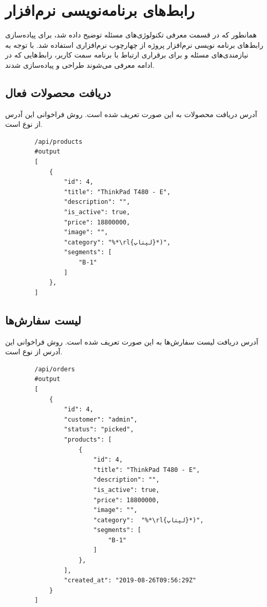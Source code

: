 \section{رابط‌های برنامه‌نویسی نرم‌افزار}
همانطور که در قسمت معرفی تکنولوژی‌های مسئله توضیح داده شد، برای پیاده‌سازی رابط‌های برنامه نویسی نرم‌افزار پروژه از چهارچوب نرم‌افزاری 
استفاده شد. با توجه به نیازمندی‌های مسئله و برای برقراری ارتباط با برنامه سمت کاربر، رابط‌هایی که در ادامه معرفی می‌شوند طراحی و پیاده‌سازی شدند.

\subsection{دریافت محصولات فعال}
آدرس دریافت محصولات به این صورت تعریف شده است. روش فراخوانی این آدرس از نوع  است.
\begin{latin}
    \begin{lstlisting}
        /api/products
        #output
        [
            {
                "id": 4,
                "title": "ThinkPad T480 - E",
                "description": "",
                "is_active": true,
                "price": 18800000,
                "image": "",
                "category": "%*\rl{لپتاپ}*)",
                "segments": [
                    "B-1"
                ]
            },
        ]

    \end{lstlisting}
\end{latin}

\subsection{لیست سفارش‌ها}
آدرس دریافت لیست سفارش‌ها به این صورت تعریف شده است. روش فراخوانی این آدرس از نوع  است.
\begin{latin}
    \begin{lstlisting}
        /api/orders
        #output
        [
            {
                "id": 4,
                "customer": "admin",
                "status": "picked",
                "products": [
                    {
                        "id": 4,
                        "title": "ThinkPad T480 - E",
                        "description": "",
                        "is_active": true,
                        "price": 18800000,
                        "image": "",
                        "category":  "%*\rl{لپتاپ}*)",
                        "segments": [
                            "B-1"
                        ]
                    },
                ],
                "created_at": "2019-08-26T09:56:29Z"
            }
        ]


    \end{lstlisting}
\end{latin}


